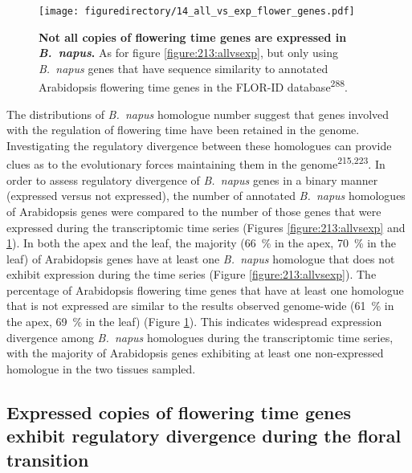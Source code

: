 \documentclass[12pt,]{book}
\begin{document}
\begin{figure}[htbp]
\centering
\texttt{[image: figuredirectory/14\_all\_vs\_exp\_flower\_genes.pdf]}
\caption{\textbf{Not all copies of flowering time genes are expressed in
\emph{B.~napus}.} As for figure \ref{figure:213:allvsexp}, but only
using \emph{B.~napus} genes that have sequence similarity to annotated
Arabidopsis flowering time genes in the FLOR-ID
database\textsuperscript{288}.}\label{figure:214:allvsexpflower}
\end{figure}

The distributions of \emph{B.~napus} homologue number suggest that genes
involved with the regulation of flowering time have been retained in the
genome. Investigating the regulatory divergence between these homologues
can provide clues as to the evolutionary forces maintaining them in the
genome\textsuperscript{215,223}. In order to assess regulatory
divergence of \emph{B.~napus} genes in a binary manner (expressed versus
not expressed), the number of annotated \emph{B.~napus} homologues of
Arabidopsis genes were compared to the number of those genes that were
expressed during the transcriptomic time series (Figures
\ref{figure:213:allvsexp} and \ref{figure:214:allvsexpflower}). In both
the apex and the leaf, the majority (66~\% in the apex, 70~\% in the
leaf) of Arabidopsis genes have at least one \emph{B.~napus} homologue
that does not exhibit expression during the time series (Figure
\ref{figure:213:allvsexp}). The percentage of Arabidopsis flowering time
genes that have at least one homologue that is not expressed are similar
to the results observed genome-wide (61~\% in the apex, 69~\% in the
leaf) (Figure \ref{figure:214:allvsexpflower}). This indicates
widespread expression divergence among \emph{B.~napus} homologues during
the transcriptomic time series, with the majority of Arabidopsis genes
exhibiting at least one non-expressed homologue in the two tissues
sampled.

\subsection{Expressed copies of flowering time genes exhibit regulatory
divergence during the floral
transition}\label{section:spring:divergence}
\end{document}

